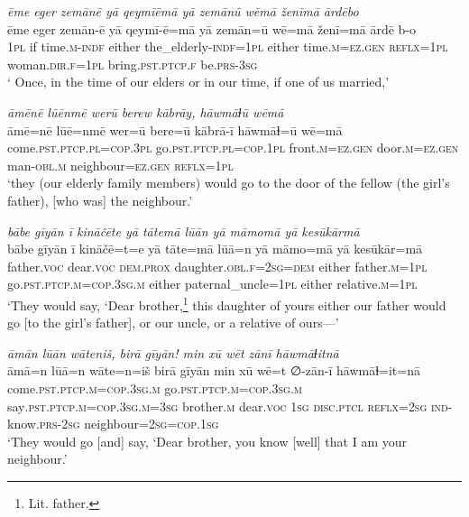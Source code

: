 \ea \label{RE.2}
\textit{ēme eger zemānē yā qeymīēmā yā zemānū wēmā ženīmā ārdēbo} \\ 
\gll ēme eger zemān-ē yā qeymī-ē=mā yā zemān=ū wē=mā ženī=mā ārdē b-o \\ 
 \textsc{1pl} if time\textsc{.m}\textsc{-indf} either the\_elderly\textsc{-indf}\textsc{=\textsc{1pl}} either time\textsc{.m}\textsc{\textsc{=ez.gen}} \textsc{reflx}\textsc{=\textsc{1pl}} woman\textsc{.dir}\textsc{.f}\textsc{=\textsc{1pl}} bring\textsc{.pst}\textsc{.ptcp}\textsc{.f} be\textsc{.prs}\textsc{-3sg} \\ 
\glt ` Once, in the time of our elders or in our time, if one of us married,'
\z 
 
\ea \label{RE.3}
\textit{āmēnē lūēnmē werū berew kābrāy, hāwmāɫū wēmā} \\ 
\gll āmē=nē lūē=nmē wer=ū bere=ū kābrā-ī hāwmāɫ=ū wē=mā \\ 
 come\textsc{.pst}\textsc{.ptcp}\textsc{.pl}\textsc{=cop}\textsc{.3pl} go\textsc{.pst}\textsc{.ptcp}\textsc{.pl}\textsc{=cop}\textsc{.\textsc{1pl}} front\textsc{.m}\textsc{\textsc{=ez.gen}} door\textsc{.m}\textsc{\textsc{=ez.gen}} man\textsc{-obl}\textsc{.m} neighbour\textsc{\textsc{=ez.gen}} \textsc{reflx}\textsc{=\textsc{1pl}} \\ 
\glt `they (our elderly family members) would go to the door of the fellow (the girl’s father), [who was] the neighbour.'
\z 
 
\ea \label{RE.4}
\textit{bābe gīyān ī kināčēte yā tātemā lūān yā māmomā yā kesūkārmā} \\ 
\gll bābe gīyān ī kināčē=t=e yā tāte=mā lūā=n yā māmo=mā yā kesūkār=mā \\ 
 father.\textsc{voc} dear.\textsc{voc} \textsc{dem.prox} daughter\textsc{.obl}\textsc{.f}\textsc{=\textsc{2sg}}\textsc{=dem} either father\textsc{.m}\textsc{=\textsc{1pl}} go\textsc{.pst}\textsc{.ptcp}\textsc{.m}\textsc{=cop}\textsc{.3sg}\textsc{.m} either paternal\_uncle\textsc{=\textsc{1pl}} either relative\textsc{.m}\textsc{=\textsc{1pl}} \\ 
\glt `They would say, ‘Dear brother,\footnote{Lit. father.} this daughter of yours \—either our father would go [to the girl’s father], or our uncle, or a relative of ours—'
\z 
 
\ea \label{RE.5}
\textit{āmān lūān wāteniš, birā gīyān! min xū wēt zānī hāwmāɫitnā} \\ 
\gll āmā=n lūā=n wāte=n=iš birā gīyān min xū wē=t ∅-zān-ī hāwmāɫ=it=nā \\ 
 come\textsc{.pst}\textsc{.ptcp}\textsc{.m}\textsc{=cop}\textsc{.3sg}\textsc{.m} go\textsc{.pst}\textsc{.ptcp}\textsc{.m}\textsc{=cop}\textsc{.3sg}\textsc{.m} say\textsc{.pst}\textsc{.ptcp}\textsc{.m}\textsc{=cop}\textsc{.3sg}\textsc{.m}\textsc{=3sg} brother\textsc{.m} dear.\textsc{voc} \textsc{1sg} \textsc{disc.ptcl} \textsc{reflx}\textsc{=\textsc{2sg}} \textsc{ind-}know\textsc{.prs}-\textsc{2sg} neighbour\textsc{=\textsc{2sg}}\textsc{=cop}\textsc{.\textsc{1sg}} \\ 
\glt `They would go [and] say, ‘Dear brother, you know [well] that I am your neighbour.'
\z 
 
